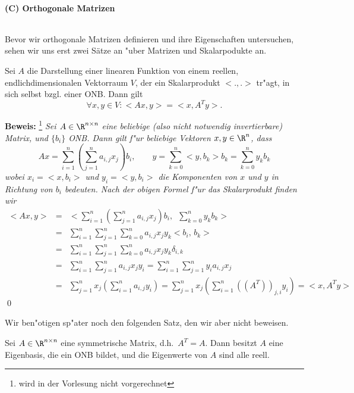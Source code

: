 \begin{auf}\chc\label{block1A5}

\end{auf}

\begin{auf}\cha\label{block1A6}

\end{auf}


\paragraph{(C) Orthogonale Matrizen}$\quad$\par
Bevor wir orthogonale Matrizen definieren und ihre Eigenschaften untersuchen, sehen wir uns erst zwei Sätze an "uber Matrizen und 
Skalarpodukte an.
\begin{slemma} Sei $A$ die Darstellung einer linearen Funktion von einem 
reellen, endlichdimensionalen Vektorraum $V$, der ein
Skalarprodukt $<.,.>$ tr"agt, in sich selbst bzgl. einer ONB. Dann gilt
$$ \forall x,y\in V:  <A x, y> = <x, A^T y>.$$
\end{slemma}
{\bf Beweis: }\footnote{wird in der Vorlesung nicht vorgerechnet} {\it Sei $A\in \R^{n\times n}$ eine
beliebige (also nicht notwendig invertierbare) Matrix, und $\{b_i\}$ ONB. Dann 
gilt f"ur beliebige Vektoren $x, y\in\R^n$, dass 
$$ Ax = \sum_{i=1}^n \left(\sum_{j=1}^n a_{i,j}x_j\right) b_i,\qquad 
y = \sum_{k=0}^n <y,b_k>b_k= \sum_{k=0}^n y_kb_k$$
wobei $x_i=<x,b_i>$ und $y_i = <y,b_i>$ die Komponenten von $x$ und $y$ in 
Richtung von $b_i$ bedeuten.  Nach der obigen Formel f"ur das Skalarprodukt 
finden wir
\begin{eqnarray*}
<Ax,y>  
& = & <  \sum_{i=1}^n \left(\sum_{j=1}^n a_{i,j}x_j\right) b_i,\,\,\,  \sum_{k=0}^n y_kb_k>\\
& = &  \sum_{i=1}^n \sum_{j=1}^n \sum_{k=0}^n a_{i,j} x_j  y_k  <b_i,\, b_k>  \\
& = &  \sum_{i=1}^n \sum_{j=1}^n \sum_{k=0}^n a_{i,j} x_j  y_k \delta_{i,k} \\
& = &  \sum_{i=1}^n \sum_{j=1}^n  a_{i,j} x_j  y_i  =   \sum_{i=1}^n \sum_{j=1}^n  y_i a_{i,j} x_j \\
& = & \sum_{j=1}^n x_j \left(\sum_{i=1}^n a_{i,j}y_i\right)  = \sum_{j=1}^n x_j \left(\sum_{i=1}^n ((A^T))_{j,i}y_i\right)  = <x, A^Ty>
\end{eqnarray*}}
\qed
\newpage 

Wir ben"otigen sp"ater noch den folgenden Satz, den wir aber nicht beweisen.
\begin{satz}\label{symmEV}
Sei $A\in\R^{n\times n}$ eine symmetrische Matrix, d.h.\ $A^T=A$. Dann besitzt
$A$ eine Eigenbasis, die ein ONB bildet, und die Eigenwerte von $A$ sind alle reell.
\end{satz}


